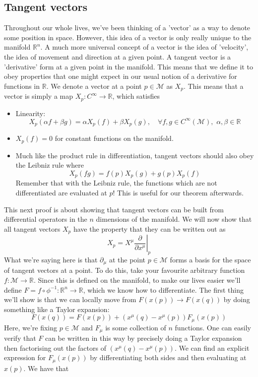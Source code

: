 \subsection{Tangent vectors}
Throughout our whole lives, we've been thinking of a 'vector' as a way to denote some position in space. However, this idea of a vector is only really unique to the manifold $\mathbb{R} ^n $. A much more universal concept of a vector is the idea of 'velocity', the idea of movement and direction at a given point.  A tangent vector is a 'derivative' form at a given point in the manifold. This means that we define it to obey properties that one might expect in our usual notion of a derivative for functions in $\mathbb{R}$. We denote a vector at a point $ p \in \mathcal{M}$ as $X_p$. 
This means that a vector is simply a map $X_p : C^\infty \rightarrow \mathbb{R} $, which satisfies  
\begin{itemize} 
\item Linearity: 
\[ X_p( \alpha f + \beta g ) = \alpha X_p ( f) + \beta X_p (g), \quad \forall f, g \in C^\infty (\mathcal M ), \, \, \alpha, \beta \in \mathbb{R} \]
\item  $X_p( f)  = 0$ for constant functions on the manifold.
\item Much like the product rule in differentiation, tangent vectors should also obey the Leibniz rule where 
\[ 
X_p(fg) = f(p ) X_p (g) + g(p) X_p (f) 
\] 
Remember that with the Leibniz rule, the functions which are not differentiated are evaluated at $p$! This is useful for our theorem afterwards.  
\end{itemize} 
This next proof is about showing that tangent vectors can be built from differential operators in the $n$ dimensions of the manifold. 
We will now show that all tangent vectors $X_p$ have the property that they can be written out as 
\[ 
X_p = X^\mu  \left. \frac{ \partial }{ \partial x^\mu } \right\vert_{p} 
\] What we're saying here is that $ \partial_\mu $ at the point $p \in \mathcal{M} $ forms a basis for the space of tangent vectors at a point. 
To do this, take your favourite arbitrary function $f: \mathcal{ M} \rightarrow \mathbb{R} $. Since this is defined on the manifold, to make our lives easier we'll define $F = f \circ \phi^{ -1}: \mathbb{R}^n \rightarrow \mathbb{R} $, which we know how to differentiate. The first thing we'll show is that we can locally move from $F(x(p)) \rightarrow F(x(q)) $ by doing something like a Taylor expansion: 
\[ 
F( x(q)) = F(x(p))    + ( x^\mu (q)  - x^\mu (p) ) F_\mu ( x( p)) 
\] 
Here, we're fixing $p \in \mathcal{ M} $ and $F_\mu$ is some collection of $n$ functions. One can easily verify that $F$ can be written in this way by precisely doing a Taylor expansion then factorising out the factors of $(x^\mu (q)  - x^\mu (p) )$. We can find an explicit expression for $F_\mu ( x(p ))$ by differentiating both sides and then evaluating at $x( p)$. We have that 
